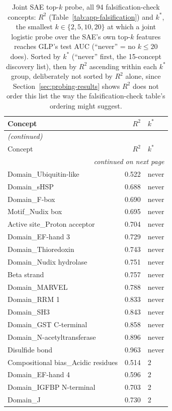 \documentclass{article}
\begin{document}
\begin{longtable}{p{6.8cm}rp{2.0cm}}
\caption{Joint SAE top-$k$ probe, all 94 falsification-check concepts: $R^2$
(Table~\ref{tab:app-falsification}) and $k^*$, the smallest $k \in \{2,5,10,20\}$ at
which a joint logistic probe over the SAE's own top-$k$ features reaches GLP's test AUC
(``never'' = no $k \le 20$ does). Sorted by $k^*$ (``never'' first, the 15-concept
discovery list), then by $R^2$ ascending within each $k^*$ group, deliberately not
sorted by $R^2$ alone, since Section~\ref{sec:probing-results} shows $R^2$ does not order
this list the way the falsification-check table's ordering might suggest.}
\label{tab:app-topk} \\
\toprule
Concept & $R^2$ & $k^*$ \\
\midrule
\endfirsthead
\multicolumn{3}{l}{\textit{(continued)}} \\
\toprule
Concept & $R^2$ & $k^*$ \\
\midrule
\endhead
\midrule \multicolumn{3}{r}{\textit{continued on next page}} \\
\endfoot
\bottomrule
\endlastfoot
Domain\_Ubiquitin-like & 0.522 & never \\
Domain\_sHSP & 0.688 & never \\
Domain\_F-box & 0.690 & never \\
Motif\_Nudix box & 0.695 & never \\
Active site\_Proton acceptor & 0.704 & never \\
Domain\_EF-hand 3 & 0.729 & never \\
Domain\_Thioredoxin & 0.743 & never \\
Domain\_Nudix hydrolase & 0.751 & never \\
Beta strand & 0.757 & never \\
Domain\_MARVEL & 0.788 & never \\
Domain\_RRM 1 & 0.833 & never \\
Domain\_SH3 & 0.843 & never \\
Domain\_GST C-terminal & 0.858 & never \\
Domain\_N-acetyltransferase & 0.896 & never \\
Disulfide bond & 0.963 & never \\
Compositional bias\_Acidic residues & 0.514 & 2 \\
Domain\_EF-hand 4 & 0.596 & 2 \\
Domain\_IGFBP N-terminal & 0.703 & 2 \\
Domain\_J & 0.730 & 2 \\

\end{longtable}
\end{document}
